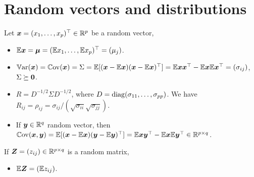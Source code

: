 \documentclass[10pt,a4paper]{book}
\begin{document}
\section{Random vectors and distributions}\label{sec:random_vector}
\begin{defbox}
	\begin{definition}\label{def:random_vector_moments}
		Let $\x=(x_1,\ldots, x_p)^\TT\in\bbR^p$ be a random vector, 
		\begin{itemize}
			\item {} $\bbE \x = \bam=(\bbE x_1,\ldots,\bbE x_p)^\TT=(\mu_j)$.
			\item {} $\Var(\x)=\Cov(\x)=\Sigma=\bbE[(\x-\bbE\x)(\x-\bbE\x)^\TT]=\bbE \x\x^\TT - \bbE \x \bbE \x^\TT = (\sigma_{ij})$, $\Sigma\succeq \0$.
			\item {} $R=D^{-1/2}\Sigma D^{-1/2}$, where $D=\diag(\sigma_{11},\ldots,\sigma_{pp})$. We have $R_{ij}=\rho_{ij}=\sigma_{ij}/(\sqrt{\sigma_{ii}}\sqrt{\sigma_{jj}})$.
			\item If $\y\in\bbR^{q}$ random vector, then $\Cov(\x,\y)=\bbE[(\x-\bbE\x)(\y-\bbE\y)^\TT]=\bbE\x\y^\TT-\bbE\x\bbE\y^\TT\in\bbR^{p\times q}$.  
		\end{itemize} 
		If $\Z=(z_{ij})\in\bbR^{p\times q}$ is a random matrix,
		\begin{itemize}
			\item $\bbE\Z=(\bbE z_{ij})$. 
		\end{itemize} 
	\end{definition}
\end{defbox}
\end{document}
